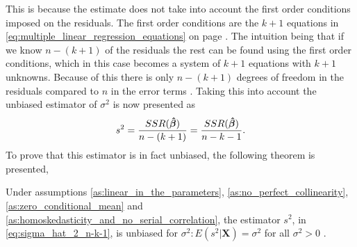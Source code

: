 This is because the estimate does not take into account the first order conditions imposed on the residuals.
The first order conditions are the $k + 1$ equations in \eqref{eq:multiple_linear_regression_equations} on page \pageref{eq:multiple_linear_regression_equations}.
The intuition being that if we know $n - (k + 1)$ of the residuals the rest can be found using the first order conditions, which in this case becomes a system of $k + 1$ equations with $k + 1$ unknowns. 
Because of this there is only $n - (k + 1)$ degrees of freedom in the residuals compared to $n$ in the error terms \cite[p. 55]{Wooldridge2012}.
Taking this into account the unbiased estimator of $\sigma^2$ is now presented as
\begin{align} \label{eq:sigma_hat_2_n-k-1}
    s^2 = \frac{SSR(\operatorname{\boldsymbol{\hat{\beta}}})}{n - (k + 1)} = \frac{SSR(\operatorname{\boldsymbol{\hat{\beta}}})}{n - k - 1}.
\end{align}
To prove that this estimator is in fact unbiased, the following theorem is presented,
\begin{theorem}
    Under assumptions \ref{as:linear_in_the_parameters}, \ref{as:no_perfect_collinearity}, \ref{as:zero_conditional_mean} and \ref{as:homoskedasticity_and_no_serial_correlation}, the estimator $s^2$, in \eqref{eq:sigma_hat_2_n-k-1}, is unbiased for $\sigma^2:E(s^2|\mathbf{X}) = \sigma^2$ for all $\sigma^2 > 0$ \cite[p. 813]{Wooldridge2012}.
\end{theorem}
